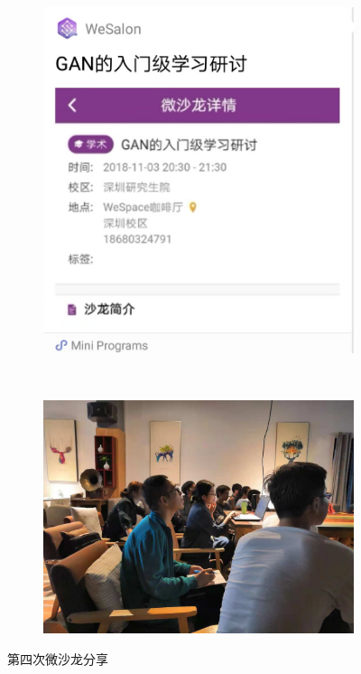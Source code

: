 \documentclass[12pt]{ctexart}
\begin{document}
\begin{figure}[!ht]
\centering
  \begin{subfigure}[b]{0.4\textwidth}
  \includegraphics[width=\textwidth]{4/4.jpeg}  
    \end{subfigure}~
      \begin{subfigure}[b]{0.5\textwidth}
  \includegraphics[width=\textwidth]{4/wesalon.jpg}  
    \end{subfigure}
    \caption{第四次微沙龙分享}        
\end{figure}
\end{document}
